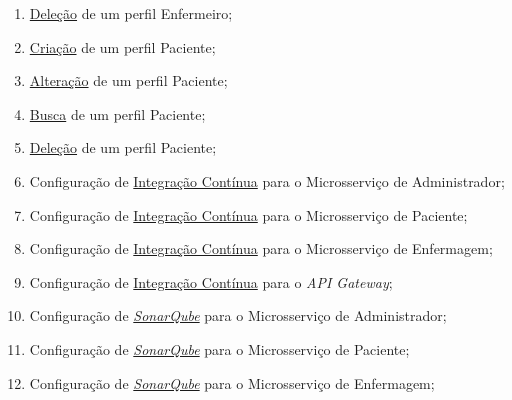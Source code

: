 \begin{apendicesenv}
\begin{enumerate}
    \item \href{https://github.com/PillWatcher/pillwatcher-dpb-nursing-service/blob/master/src/main/java/br/com/pillwatcher/dpb/services/impl/NurseServiceImpl.java#L98}{Deleção} de um perfil Enfermeiro;
    \item \href{https://github.com/PillWatcher/pillwatcher-dpb-patient-service/blob/dev/src/main/java/br/com/pillwatcher/dpb/services/impl/PatientServiceImpl.java#L42}{Criação} de um perfil Paciente;
    \item \href{https://github.com/PillWatcher/pillwatcher-dpb-patient-service/blob/dev/src/main/java/br/com/pillwatcher/dpb/services/impl/PatientServiceImpl.java#L75}{Alteração} de um perfil Paciente;
    \item \href{https://github.com/PillWatcher/pillwatcher-dpb-patient-service/blob/dev/src/main/java/br/com/pillwatcher/dpb/services/impl/PatientServiceImpl.java#L113}{Busca} de um perfil Paciente;
    \item \href{https://github.com/PillWatcher/pillwatcher-dpb-patient-service/blob/dev/src/main/java/br/com/pillwatcher/dpb/services/impl/PatientServiceImpl.java#L166}{Deleção} de um perfil Paciente;
    \item Configuração de \href{https://github.com/PillWatcher/pillwatcher-dpb-admin-service/blob/master/.travis.yml}{Integração Contínua} para o Microsserviço de Administrador;
    \item Configuração de \href{https://github.com/PillWatcher/pillwatcher-dpb-patient-service/blob/master/.travis.yml}{Integração Contínua} para o Microsserviço de Paciente;
    \item Configuração de \href{https://github.com/PillWatcher/pillwatcher-dpb-nursing-service/blob/master/.travis.yml}{Integração Contínua} para o Microsserviço de Enfermagem;
    \item Configuração de \href{https://github.com/PillWatcher/pillwatcher-api-gateway/blob/master/.travis.yml}{Integração Contínua} para o \textit{API Gateway};
    \item Configuração de \href{https://github.com/PillWatcher/pillwatcher-dpb-admin-service/blob/master/sonar-project.properties}{\textit{SonarQube}} para o Microsserviço de Administrador;
    \item Configuração de \href{https://github.com/PillWatcher/pillwatcher-dpb-patient-service/blob/master/sonar-project.properties}{\textit{SonarQube}} para o Microsserviço de Paciente;
    \item Configuração de \href{https://github.com/PillWatcher/pillwatcher-dpb-nursing-service/blob/master/sonar-project.properties}{\textit{SonarQube}} para o Microsserviço de Enfermagem;

\end{enumerate}
\end{apendicesenv}
